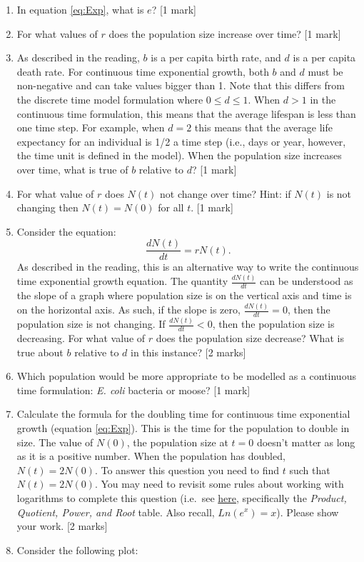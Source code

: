 \documentclass[]{book}
\begin{document}
\begin{enumerate}
\def\labelenumi{\arabic{enumi}.}
\item
  In equation \eqref{eq:Exp}, what is \(e\)? {[}1 mark{]}
\item
  For what values of \(r\) does the population size increase over time?
  {[}1 mark{]}
\item
  As described in the reading, \(b\) is a per capita birth rate, and
  \(d\) is a per capita death rate. For continuous time exponential
  growth, both \(b\) and \(d\) must be non-negative and can take values
  bigger than 1. Note that this differs from the discrete time model
  formulation where \(0 \leq d \leq 1\). When \(d > 1\) in the
  continuous time formulation, this means that the average lifespan is
  less than one time step. For example, when \(d = 2\) this means that
  the average life expectancy for an individual is 1/2 a time step
  (i.e., days or year, however, the time unit is defined in the model).
  When the population size increases over time, what is true of \(b\)
  relative to \(d\)? {[}1 mark{]}
\item
  For what value of \(r\) does \(N(t)\) not change over time? Hint: if
  \(N(t)\) is not changing then \(N(t)=N(0)\) for all \(t\). {[}1
  mark{]}
\item
  Consider the equation: \[
  \frac{dN(t)}{dt} = rN(t).
  \] As described in the reading, this is an alternative way to write
  the continuous time exponential growth equation. The quantity
  \(\frac{dN(t)}{dt}\) can be understood as the slope of a graph where
  population size is on the vertical axis and time is on the horizontal
  axis. As such, if the slope is zero, \(\frac{dN(t)}{dt}=0\), then the
  population size is not changing. If \(\frac{dN(t)}{dt}<0\), then the
  population size is decreasing. For what value of \(r\) does the
  population size decrease? What is true about \(b\) relative to \(d\)
  in this instance? {[}2 marks{]}
\item
  Which population would be more appropriate to be modelled as a
  continuous time formulation: \emph{E. coli} bacteria or moose? {[}1
  mark{]}
\item
  Calculate the formula for the doubling time for continuous time
  exponential growth (equation \eqref{eq:Exp}). This is the time for the
  population to double in size. The value of \(N(0)\), the population
  size at \(t=0\) doesn't matter as long as it is a positive number.
  When the population has doubled, \(N(t) = 2N(0)\). To answer this
  question you need to find \(t\) such that \(N(t) = 2N(0)\). You may
  need to revisit some rules about working with logarithms to complete
  this question (i.e.~see
  \href{https://en.wikipedia.org/wiki/Logarithm}{here}, specifically the
  \emph{Product, Quotient, Power, and Root} table. Also recall,
  \(Ln(e^x) = x\)). Please show your work. {[}2 marks{]}
\item
  Consider the following plot:


\end{enumerate}
\end{document}
